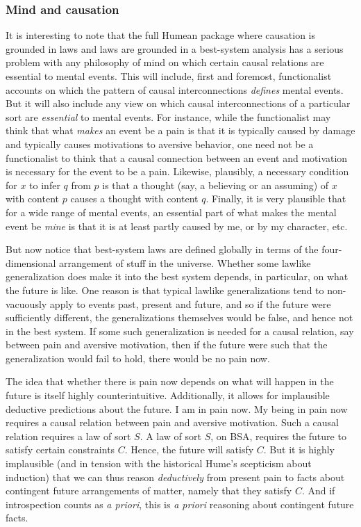 \subsubsection{Mind and causation}
It is interesting to note that the full Humean package where causation is grounded in laws and laws are grounded in a best-system 
analysis has a serious problem with any philosophy of mind on which certain causal relations are essential to mental events. This will
include, first and foremost, functionalist accounts on which the pattern of causal interconnections \textit{defines} mental events.
But it will also include any view on which causal interconnections of a particular sort are \textit{essential} to mental events.
For instance, while the functionalist may think that what \textit{makes} an event be a pain is that it is typically caused by
damage and typically causes motivations to aversive behavior, one need not be a functionalist to think that a causal connection between 
an event and motivation is necessary for the event to be a pain. Likewise, plausibly, a necessary condition for $x$ to
infer $q$ from $p$ is that a thought (say, a believing or an assuming) of $x$ with content $p$ causes a thought with content $q$. Finally, it is very
plausible that for a wide range of mental events, an essential part of what makes the mental event be \textit{mine} is that it is 
at least partly caused by me, or by my character, etc. 

But now notice that best-system laws are defined globally in terms of the four-dimensional arrangement of stuff in the universe. 
Whether some lawlike generalization does make it into the best system depends, in particular, on what the future is like. One reason 
is that typical lawlike generalizations tend to non-vacuously apply to events past, present and future, and so if the future 
were sufficiently different, the generalizations themselves would be false, and hence not in the best system. If some such generalization
is needed for a causal relation, say between pain and aversive motivation, then if the future were such that the generalization would fail
to hold, there would be no pain now. 

The idea that whether there is pain now depends on what will happen in the future is itself highly counterintuitive. Additionally, it 
allows for implausible deductive predictions about the future. I am in pain now. My being in pain now requires a causal relation between
pain and aversive motivation. Such a causal relation requires a law of sort $S$. A law of sort $S$, on BSA, requires the future
to satisfy certain constraints $C$. Hence, the future will satisfy $C$. But it is highly implausible (and in tension with the 
historical Hume's scepticism about induction) that we can thus reason \textit{deductively} from present pain to facts about contingent future arrangements
of matter, namely that they satisfy $C$. And if introspection counts as \textit{a priori}, this is \textit{a priori} reasoning about contingent future facts.

